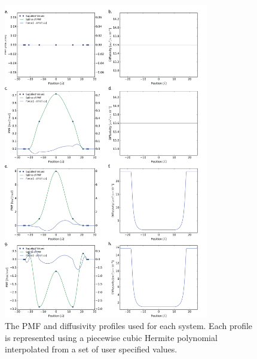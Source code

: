     \begin{figure}[htbp]
    \begin{center}
        \includegraphics[width=0.8\textwidth]{Figures/profiles.png}
        \caption{The PMF and diffusivity profiles used for each system. Each profile is represented using a piecewise cubic Hermite polynomial interpolated from a set of user specified values.}
        \label{fig:profiles}
    \end{center}
    \end{figure}

